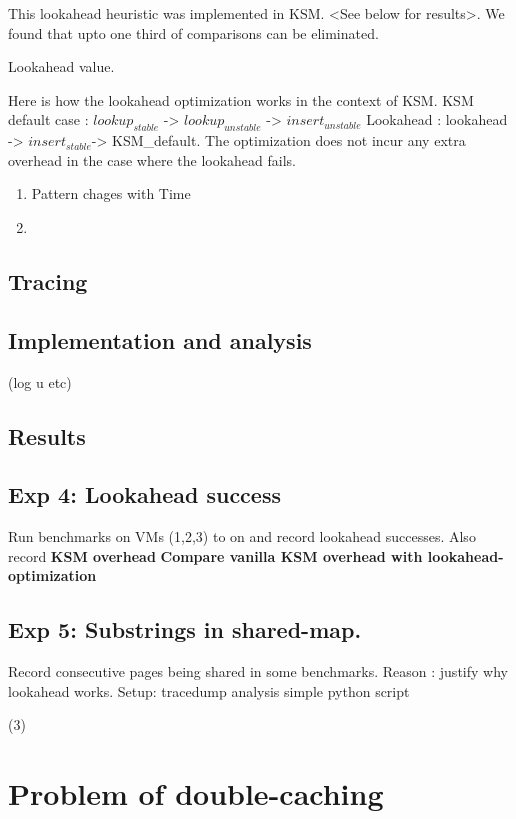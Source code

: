\documentclass[10pt,a4paper]{article}
\begin{document}
This lookahead heuristic was implemented in KSM. <See below for results>. 
We found that upto one third of comparisons can be eliminated.

Lookahead value.

Here is how the lookahead optimization works in the context of KSM. 
KSM default case : $lookup_{stable}$ -> $lookup_{unstable}$ -> $insert_{unstable}$
Lookahead : lookahead -> $insert_{stable}$-> KSM_default.
The optimization does not incur any extra overhead in the case where the lookahead fails.


\begin{enumerate}
\item Pattern chages with Time
\item 
\end{enumerate}

\subsection{Tracing}

\subsection{Implementation and analysis}

   (log u etc)
\subsection{Results}

\subsection{Exp 4: Lookahead success}

Run benchmarks on VMs (1,2,3) to on and record lookahead successes. Also record \textbf{KSM overhead}
\textbf{Compare vanilla KSM overhead with lookahead-optimization}


\subsection{Exp 5: Substrings in shared-map.}

Record consecutive pages being shared in some benchmarks.
Reason : justify why lookahead works.
Setup: tracedump analysis simple python script 

   (3)

\section{Problem of double-caching}
\end{document}
